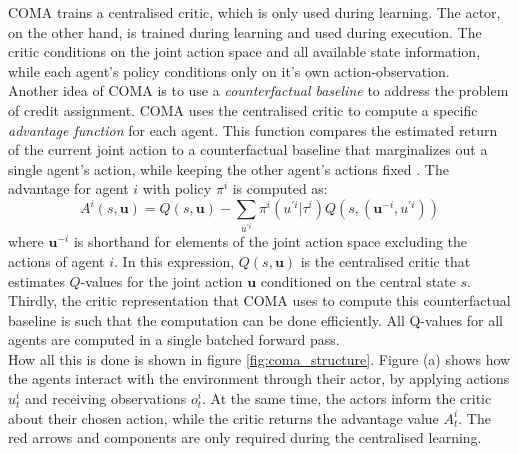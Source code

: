 COMA trains a centralised critic, which is only used during learning. The actor, on the other hand, is trained during learning and used during execution. The critic conditions on the joint action space and all available state information, while each agent's policy conditions only on it's own action-observation.\\

Another idea of COMA is to use a \emph{counterfactual baseline} to address the problem of credit assignment. COMA uses the centralised critic to compute a specific \emph{advantage function} for each agent. This function compares the estimated return of the current joint action to a counterfactual baseline that marginalizes out a single agent's action, while keeping the other agent's actions fixed \cite{foerster2018counterfactual}. The advantage for agent $i$ with policy $\pi^{i}$ is computed as:
\begin{equation}
    \label{eqn:coma}
    A^i(s, \bm{u}) = Q(s, \bm{u}) - \sum_{u^{'i}} \pi^{i}(u^{'i}|\tau^i) Q(s, (\bm{u}^{-i}, u^{'i}))
\end{equation}
where $\bm{u}^{-i}$ is shorthand for elements of the joint action space excluding the actions of agent $i$. In this expression, $Q(s, \bm{u})$ is the centralised critic that estimates $Q$-values for the joint action $\bm{u}$ conditioned on the central state $s$.\\

Thirdly, the critic representation that COMA uses to compute this counterfactual baseline is such that the computation can be done efficiently. All Q-values for all agents are computed in a single batched forward pass.\\

How all this is done is shown in figure \ref{fig:coma_structure}. Figure (a) shows how the agents interact with the environment through their actor, by applying actions $u_t^i$ and receiving observations $o_t^i$. At the same time, the actors inform the critic about their chosen action, while the critic returns the advantage value $A_t^i$. The red arrows and components are only required during the centralised learning.\\


